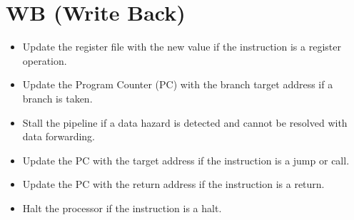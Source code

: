 \documentclass{report}
\begin{document}
\section*{WB (Write Back)}
\begin{minipage}{0.6\textwidth}
\begin{itemize}
    \item Update the register file with the new value if the instruction is a register operation.
    \item Update the Program Counter (PC) with the branch target address if a branch is taken.
    \item Stall the pipeline if a data hazard is detected and cannot be resolved with data forwarding.
    \item Update the PC with the target address if the instruction is a jump or call.
    \item Update the PC with the return address if the instruction is a return.
    \item Halt the processor if the instruction is a halt.
\end{itemize}
\end{minipage}
\hspace{1cm}
\end{document}
